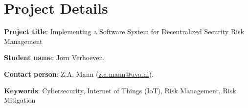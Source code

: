 \section{Project Details}
\hspace{1.15em}
\textbf{Project title}: Implementing a Software System for Decentralized Security Risk Management

\textbf{Student name}: Jorn Verhoeven.

\textbf{Contact person}: Z.A. Mann (\href{mailto://z.a.mann@uva.nl}{z.a.mann@uva.nl}).

\textbf{Keywords}: Cybersecurity, Internet of Things (IoT), Risk Management, Risk Mitigation